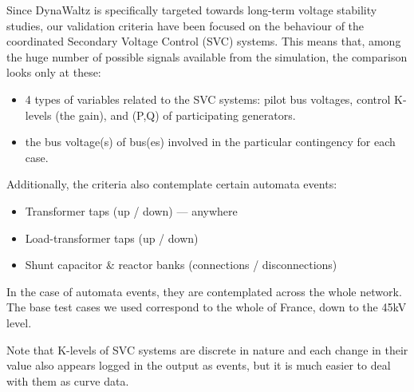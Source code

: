 \documentclass[conference]{IEEEtran}
\begin{document}
Since DynaWaltz is specifically targeted towards long-term voltage
stability studies, our validation criteria have been focused on the
behaviour of the coordinated Secondary Voltage Control (SVC)
systems. This means that, among the huge number of possible signals
available from the simulation, the comparison looks only at these:
\begin{itemize}
\item 4 types of variables related to the SVC systems: pilot bus
  voltages, control K-levels (the gain), and (P,Q) of participating
  generators.
\item the bus voltage(s) of bus(es) involved in the particular
  contingency for each case.
\end{itemize}
Additionally, the criteria also contemplate certain automata events:
\begin{itemize}
  \item Transformer taps (up / down) --- anywhere
  \item Load-transformer taps (up / down)
  \item Shunt capacitor \& reactor banks  (connections / disconnections)
\end{itemize}
In the case of automata events, they are contemplated across the whole
network. The base test cases we used correspond to the whole of
France, down to the 45kV level.

Note that K-levels of SVC systems are discrete in nature and each
change in their value also appears logged in the output as events, but
it is much easier to deal with them as curve data.
\end{document}
